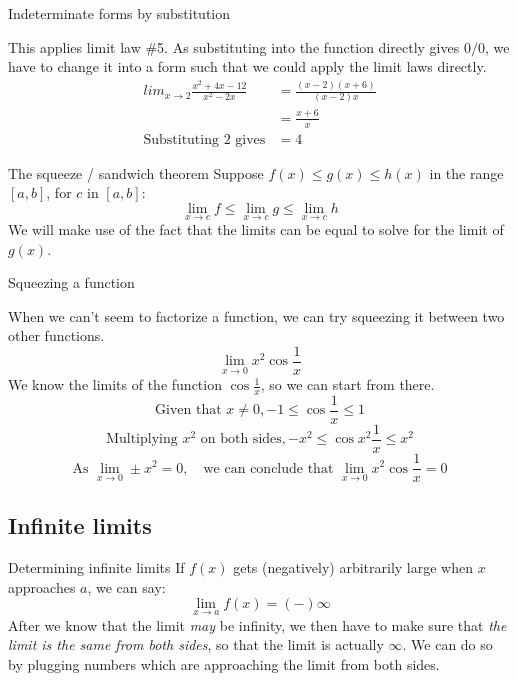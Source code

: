 \documentclass{article}
\begin{document}
\begin{example}
    Indeterminate forms by substitution

    This applies limit law \#5. As substituting into the function directly gives $0/0$, we have to change it into a form such that we could apply the limit laws directly.
    \begin{align*}
        lim_{x\to 2}\frac{x^2+4x-12}{x^2-2x} & =\frac{(x-2)(x+6)}{(x-2)x} \\
                                             & =\frac{x+6}{x}             \\
        \text{Substituting 2 gives}          & =4
    \end{align*}
\end{example}


\begin{theorem}
    {The squeeze / sandwich theorem}
    Suppose $f(x)\le g(x) \le h(x)$ in the range $[a, b]$, for $c$ in $[a, b]$:
    \[\lim_{x\to c}f \le \lim_{x\to c}g \le \lim_{x\to c}h\]
    We will make use of the fact that the limits can be equal to solve for the limit of $g(x)$.
\end{theorem}

\begin{example}
    Squeezing a function

    When we can't seem to factorize a function, we can try squeezing it between two other functions.
    \[\lim_{x\to 0}x^2\cos\frac{1}{x}\]
    We know the limits of the function $\cos \frac{1}{x}$, so we can start from there.
    \[\text{Given that }x\ne 0, -1\le \cos \frac{1}{x} \le 1\]
    \[\text{Multiplying }x^2\text{ on both sides},-x^2\le \cos x^2\frac{1}{x} \le x^2\]
    \[\text{As }\lim_{x\to 0}\pm x^2=0,\quad\text{we can conclude that }\lim_{x\to 0}x^2\cos\frac{1}{x}=0\]
\end{example}

\subsection{Infinite limits}
\begin{knBox}
    {Determining infinite limits}
    If $f(x)$ gets (negatively) arbitrarily large when $x$ approaches $a$, we can say:
    \[\lim_{x\to a}f(x)=(-)\infty\]
    After we know that the limit \emph{may} be infinity, we then have to make sure that \emph{the limit is the same from both sides}, so that the limit is actually $\infty$. We can do so by plugging numbers which are approaching the limit from both sides.
\end{knBox}
\end{document}

